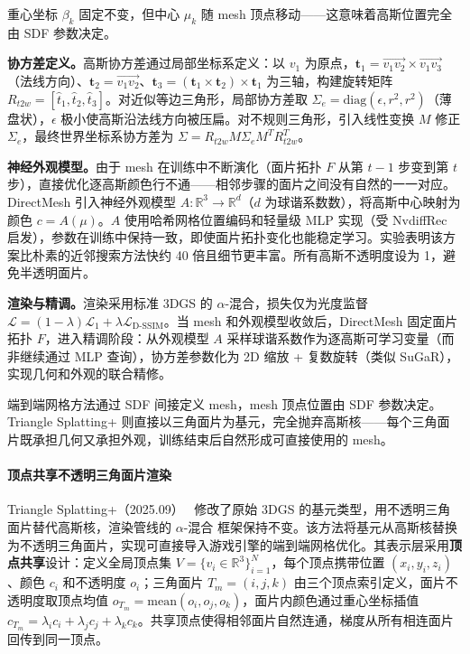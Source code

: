 重心坐标 $\beta_k$ 固定不变，但中心 $\mu_k$ 随 mesh 顶点移动——这意味着高斯位置完全由 SDF 参数决定。

\textbf{协方差定义。}高斯协方差通过局部坐标系定义：以 $v_1$ 为原点，$\bm{t}_1 = \overrightarrow{v_1 v_2} \times \overrightarrow{v_1 v_3}$（法线方向）、$\bm{t}_2 = \overrightarrow{v_1 v_2}$、$\bm{t}_3 = (\bm{t}_1 \times \bm{t}_2) \times \bm{t}_1$ 为三轴，构建旋转矩阵 $R_{t2w} = [\hat{t}_1, \hat{t}_2, \hat{t}_3]$。对近似等边三角形，局部协方差取 $\Sigma_e = \text{diag}(\epsilon, r^2, r^2)$（薄盘状），$\epsilon$ 极小使高斯沿法线方向被压扁。对不规则三角形，引入线性变换 $M$ 修正 $\Sigma_e$，最终世界坐标系协方差为 $\Sigma = R_{t2w} M \Sigma_e M^T R_{t2w}^T$。

\textbf{神经外观模型。}由于 mesh 在训练中不断演化（面片拓扑 $F$ 从第 $t-1$ 步变到第 $t$ 步），直接优化逐高斯颜色行不通——相邻步骤的面片之间没有自然的一一对应。DirectMesh 引入神经外观模型 $A: \mathbb{R}^3 \to \mathbb{R}^d$（$d$ 为球谐系数数），将高斯中心映射为颜色 $c = A(\mu)$。$A$ 使用哈希网格位置编码和轻量级 MLP 实现（受 NvdiffRec 启发），参数在训练中保持一致，即使面片拓扑变化也能稳定学习。实验表明该方案比朴素的近邻搜索方法快约 40 倍且细节更丰富。所有高斯不透明度设为 1，避免半透明面片。

\textbf{渲染与精调。}渲染采用标准 3DGS 的 $\alpha$-混合，损失仅为光度监督 $\mathcal{L} = (1-\lambda)\mathcal{L}_1 + \lambda \mathcal{L}_{\text{D-SSIM}}$。当 mesh 和外观模型收敛后，DirectMesh 固定面片拓扑 $F$，进入精调阶段：从外观模型 $A$ 采样球谐系数作为逐高斯可学习变量（而非继续通过 MLP 查询），协方差参数化为 2D 缩放 + 复数旋转（类似 SuGaR），实现几何和外观的联合精修。

端到端网格方法通过 SDF 间接定义 mesh，mesh 顶点位置由 SDF 参数决定。Triangle Splatting+ 则直接以三角面片为基元，完全抛弃高斯核——每个三角面片既承担几何又承担外观，训练结束后自然形成可直接使用的 mesh。

\paragraph{顶点共享不透明三角面片渲染}

Triangle Splatting+（2025.09）~\cite{2509_25122} 修改了原始 3DGS 的基元类型，用不透明三角面片替代高斯核，渲染管线的 $\alpha$-混合 框架保持不变。该方法将基元从高斯核替换为不透明三角面片，实现可直接导入游戏引擎的端到端网格优化。其表示层采用\textbf{顶点共享}设计：定义全局顶点集 $V=\{v_i \in \mathbb{R}^3\}_{i=1}^{N}$，每个顶点携带位置 $(x_i, y_i, z_i)$、颜色 $c_i$ 和不透明度 $o_i$；三角面片 $T_m=(i,j,k)$ 由三个顶点索引定义，面片不透明度取顶点均值 $o_{T_m}=\text{mean}(o_i, o_j, o_k)$，面片内颜色通过重心坐标插值 $c_{T_m}=\lambda_i c_i + \lambda_j c_j + \lambda_k c_k$。共享顶点使得相邻面片自然连通，梯度从所有相连面片回传到同一顶点。

